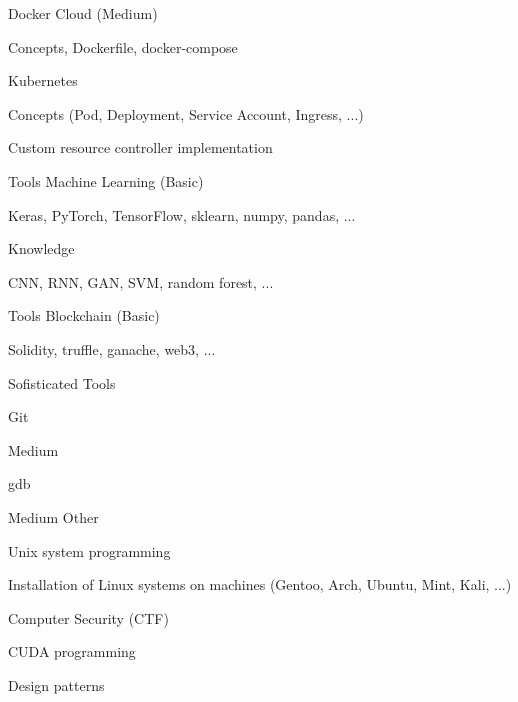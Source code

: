 \begin{cventries}
  \cventry
    {Docker}
    {Cloud (Medium)}
    {}
    {}
    {
      \begin{cvitems}
        \item {Concepts, Dockerfile, docker-compose}
      \end{cvitems}
    }

  \cventry
    {Kubernetes}
    {}
    {}
    {}
    {
      \begin{cvitems}
      	\item {Concepts (Pod, Deployment, Service Account, Ingress, ...)}
        \item {Custom resource controller implementation}
      \end{cvitems}
    }

  \cventry
    {Tools}
    {Machine Learning (Basic)}
    {}
    {}
    {
      \begin{cvitems}
        \item {Keras, PyTorch, TensorFlow, sklearn, numpy, pandas, ...}
      \end{cvitems}
    }

  \cventry
    {Knowledge}
    {}
    {}
    {}
    {
      \begin{cvitems}
        \item {CNN, RNN, GAN, SVM, random forest, ...}
      \end{cvitems}
    }

  \cventry
    {Tools}
    {Blockchain (Basic)}
    {}
    {}
    {
      \begin{cvitems}
        \item {Solidity, truffle, ganache, web3, ...}
      \end{cvitems}
    }

  \cventry
    {Sofisticated}
    {Tools}
    {}
    {}
    {
      \begin{cvitems}
        \item {Git}
      \end{cvitems}
    }
    
  \cventry
    {Medium}
    {}
    {}
    {}
    {
      \begin{cvitems}
        \item {gdb}
      \end{cvitems}
    }

  \cventry
    {Medium}
    {Other}
    {}
    {}
    {
      \begin{cvitems}
        \item {Unix system programming}
        \item {Installation of Linux systems on machines (Gentoo, Arch, Ubuntu, Mint, Kali, ...)}
        \item {Computer Security (CTF)}
        \item {CUDA programming}
        \item {Design patterns}
      \end{cvitems}
    }
    

\end{cventries}
